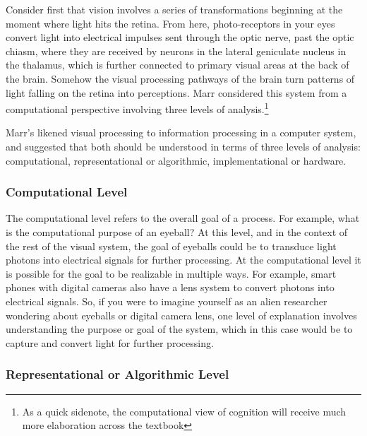 \documentclass[
  oneside,
  12pt]{crumpbook}
\begin{document}
Consider first that vision involves a series of transformations beginning at the moment where light hits the retina. From here, photo-receptors in your eyes convert light into electrical impulses sent through the optic nerve, past the optic chiasm, where they are received by neurons in the lateral geniculate nucleus in the thalamus, which is further connected to primary visual areas at the back of the brain. Somehow the visual processing pathways of the brain turn patterns of light falling on the retina into perceptions. Marr considered this system from a computational perspective involving three levels of analysis.\footnote{As a quick sidenote, the computational view of cognition will receive much more elaboration across the textbook}

Marr's likened visual processing to information processing in a computer system, and suggested that both should be understood in terms of three levels of analysis: computational, representational or algorithmic, implementational or hardware.

\hypertarget{computational-level}{%
\subsubsection{Computational Level}\label{computational-level}}

The computational level refers to the overall goal of a process. For example, what is the computational purpose of an eyeball? At this level, and in the context of the rest of the visual system, the goal of eyeballs could be to transduce light photons into electrical signals for further processing. At the computational level it is possible for the goal to be realizable in multiple ways. For example, smart phones with digital cameras also have a lens system to convert photons into electrical signals. So, if you were to imagine yourself as an alien researcher wondering about eyeballs or digital camera lens, one level of explanation involves understanding the purpose or goal of the system, which in this case would be to capture and convert light for further processing.

\hypertarget{representational-or-algorithmic-level}{%
\subsubsection{Representational or Algorithmic Level}\label{representational-or-algorithmic-level}}
\end{document}
